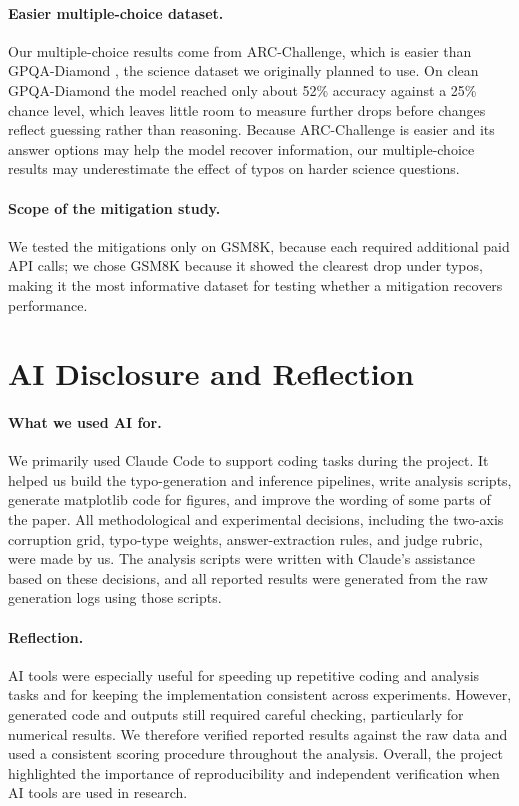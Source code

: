 \documentclass[11pt]{article}
\begin{document}
\paragraph{Easier multiple-choice dataset.} Our multiple-choice results come from ARC-Challenge, which is easier than GPQA-Diamond \citep{rein2024}, the science dataset we originally planned to use. On clean GPQA-Diamond the model reached only about 52\% accuracy against a 25\% chance level, which leaves little room to measure further drops before changes reflect guessing rather than reasoning. Because ARC-Challenge is easier and its answer options may help the model recover information, our multiple-choice results may underestimate the effect of typos on harder science questions.

\paragraph{Scope of the mitigation study.} We tested the mitigations only on GSM8K, because each required additional paid API calls; we chose GSM8K because it showed the clearest drop under typos, making it the most informative dataset for testing whether a mitigation recovers performance.


\clearpage
\section*{AI Disclosure and Reflection}

\paragraph{What we used AI for.} We primarily used Claude Code to support coding tasks during the project. It helped us build the typo-generation and inference pipelines, write analysis scripts, generate matplotlib code for figures, and improve the wording of some parts of the paper. All methodological and experimental decisions, including the two-axis corruption grid, typo-type weights, answer-extraction rules, and judge rubric, were made by us. The analysis scripts were written with Claude's assistance based on these decisions, and all reported results were generated from the raw generation logs using those scripts.

\paragraph{Reflection.} AI tools were especially useful for speeding up repetitive coding and analysis tasks and for keeping the implementation consistent across experiments. However, generated code and outputs still required careful checking, particularly for numerical results. We therefore verified reported results against the raw data and used a consistent scoring procedure throughout the analysis. Overall, the project highlighted the importance of reproducibility and independent verification when AI tools are used in research.
\end{document}
